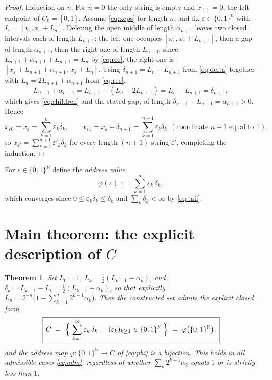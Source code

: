 \documentclass{amsart}
\newtheorem{theorem}{Theorem}
\theoremstyle{definition}
\theoremstyle{remark}
\begin{document}
\begin{proof}
Induction on $n$. For $n=0$ the only string is empty and $x_{()}=0$, the left
endpoint of $C_0=[0,1]$. Assume \eqref{eq:xeps} for length $n$, and fix
$\varepsilon\in\{0,1\}^n$ with $I_\varepsilon=[x_\varepsilon,x_\varepsilon+L_{n}]$.
Deleting the open middle of length $\alpha_{n+1}$ leaves two closed intervals each
of length $L_{n+1}$: the left one occupies $[x_\varepsilon,x_\varepsilon+L_{n+1}]$,
then a gap of length $\alpha_{n+1}$, then the right one of length $L_{n+1}$; since
$L_{n+1}+\alpha_{n+1}+L_{n+1}=L_n$ by \eqref{eq:rec}, the right one is
$[x_\varepsilon+L_{n+1}+\alpha_{n+1},\,x_\varepsilon+L_n]$. Using
$\delta_{n+1}=L_n-L_{n+1}$ from \eqref{eq:delta} together with
$L_n=2L_{n+1}+\alpha_{n+1}$ from \eqref{eq:rec},
\[
L_{n+1}+\alpha_{n+1}=L_{n+1}+(L_n-2L_{n+1})=L_n-L_{n+1}=\delta_{n+1},
\]
which gives \eqref{eq:children} and the stated gap, of length
$\delta_{n+1}-L_{n+1}=\alpha_{n+1}>0$. Hence
\[
x_{\varepsilon0}=x_\varepsilon=\sum_{k=1}^{n}\varepsilon_k\delta_k,
\qquad
x_{\varepsilon1}=x_\varepsilon+\delta_{n+1}=\sum_{k=1}^{n+1}\varepsilon_k\delta_k
\ \ (\text{coordinate }n{+}1\text{ equal to }1),
\]
so $x_{\varepsilon'}=\sum_{k=1}^{n+1}\varepsilon'_k\delta_k$ for every length-$(n+1)$
string $\varepsilon'$, completing the induction.
\end{proof}

For $\varepsilon\in\{0,1\}^{\mathbb N}$ define the \emph{address value}
\begin{equation}\label{eq:phi}
\varphi(\varepsilon)\ :=\ \sum_{k=1}^{\infty}\varepsilon_k\,\delta_k ,
\end{equation}
which converges since $0\le\varepsilon_k\delta_k\le\delta_k$ and
$\sum_k\delta_k<\infty$ by \eqref{eq:tail}.

\section{Main theorem: the explicit description of $C$}

\begin{theorem}\label{thm:main}
Set $L_0=1$, $L_k=\tfrac12(L_{k-1}-\alpha_k)$, and
$\delta_k=L_{k-1}-L_k=\tfrac12(L_{k-1}+\alpha_k)$, so that explicitly
$L_n=2^{-n}\bigl(1-\sum_{k=1}^{n}2^{k-1}\alpha_k\bigr)$. Then the constructed set
admits the explicit closed form
\begin{equation}\label{eq:main}
\boxed{\,C\ =\ \Bigl\{\ \sum_{k=1}^{\infty}\varepsilon_k\,\delta_k\ :\
(\varepsilon_k)_{k\ge1}\in\{0,1\}^{\mathbb N}\ \Bigr\}
\ =\ \varphi\bigl(\{0,1\}^{\mathbb N}\bigr),\,}
\end{equation}
and the address map $\varphi:\{0,1\}^{\mathbb N}\to C$ of \eqref{eq:phi} is a
bijection. This holds in all admissible cases \eqref{eq:adm}, regardless of whether
$\sum_{k}2^{k-1}\alpha_k$ equals $1$ or is strictly less than $1$.
\end{theorem}
\end{document}
